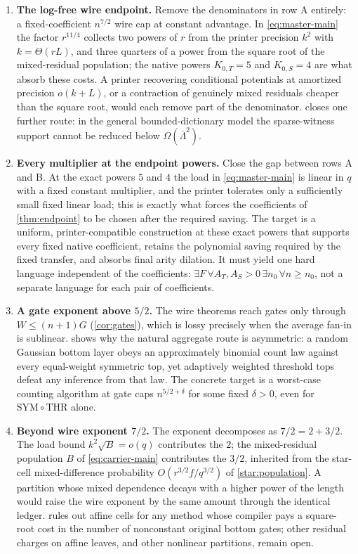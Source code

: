 \documentclass[11pt,letterpaper]{article}
\theoremstyle{definition}
\theoremstyle{remark}
\newcommand{\THR}{\mathrm{THR}}
\newcommand{\SYM}{\mathrm{SYM}}
\begin{document}
\begin{enumerate}
\item \textbf{The log-free wire endpoint.} Remove the denominators in
row A entirely: a fixed-coefficient $n^{7/2}$ wire cap at constant
advantage. In \cref{eq:master-main} the factor $r^{11/4}$ collects two
powers of $r$ from the printer precision $k^2$ with $k=\Theta(rL)$,
and three quarters of a power from the square root of the
mixed-residual population; the native powers $K_{0,T}=5$ and
$K_{0,S}=4$ are what absorb these costs. A printer recovering
conditional potentials at amortized precision $o(k+L)$, or a
contraction of genuinely mixed residuals cheaper than the square
root, would each remove part of the denominator. 
closes one further route: in the general bounded-dictionary model the
sparse-witness support cannot be reduced below
$\Omega(\overline\Lambda^{2})$.

\item \textbf{Every multiplier at the endpoint powers.} Close the gap
between rows A and B. At the exact powers $5$ and $4$ the load in
\cref{eq:master-main} is linear in $q$ with a fixed constant
multiplier, and the printer tolerates only a sufficiently small fixed
linear load; this is exactly what forces the coefficients of
\cref{thm:endpoint} to be chosen after the required saving. The target
is a uniform, printer-compatible construction at these exact powers
that supports every fixed native coefficient, retains the polynomial
saving required by the fixed transfer, and absorbs final arity dilation.
It must yield one hard language independent of the coefficients:
$\exists F\,\forall A_T,A_S>0\,\exists n_0\,\forall n\ge n_0$,
not a separate language for each pair of coefficients.

\item \textbf{A gate exponent above $5/2$.} The wire theorems reach
gates only through $W\le(n+1)G$ (\cref{cor:gates}), which is lossy
precisely when the average fan-in is sublinear.
 shows why the natural aggregate route is
asymmetric: a random Gaussian bottom layer obeys an approximately
binomial count law against every equal-weight symmetric top, yet
adaptively weighted threshold tops defeat any inference from that
law. The concrete target is a worst-case counting algorithm at gate
caps $n^{5/2+\delta}$ for some fixed $\delta>0$, even for
$\SYM\circ\THR$ alone.

\item \textbf{Beyond wire exponent $7/2$.} The exponent decomposes as
$7/2=2+3/2$. The load bound $k^{2}\sqrt B=o(q)$ contributes the $2$;
the mixed-residual population $B$ of \cref{eq:carrier-main}
contributes the $3/2$, inherited from the star-cell mixed-difference
probability $O(r^{3/2}f/q^{3/2})$ of \cref{star:population}. A
partition whose mixed dependence decays with a higher power of the
length would raise the wire exponent by the same amount through the
identical ledger.  rules out affine cells for any
method whose compiler pays a square-root cost in the number of
nonconstant original bottom gates; other residual charges on affine
leaves, and other nonlinear partitions, remain open.


\end{enumerate}
\end{document}
